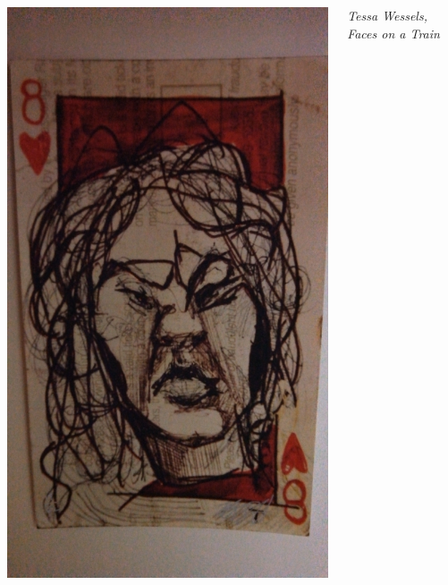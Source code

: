 \documentclass{beamer}
\begin{document}
\begin{frame}
\begin{columns}[c]
\hfill\includegraphics[height=0.8\textheight]{eight.jpg}\hfill\mbox{}

{\small\emph{Tessa Wessels, {\em Faces on a Train}}}

\end{columns}
\end{frame}
\end{document}
